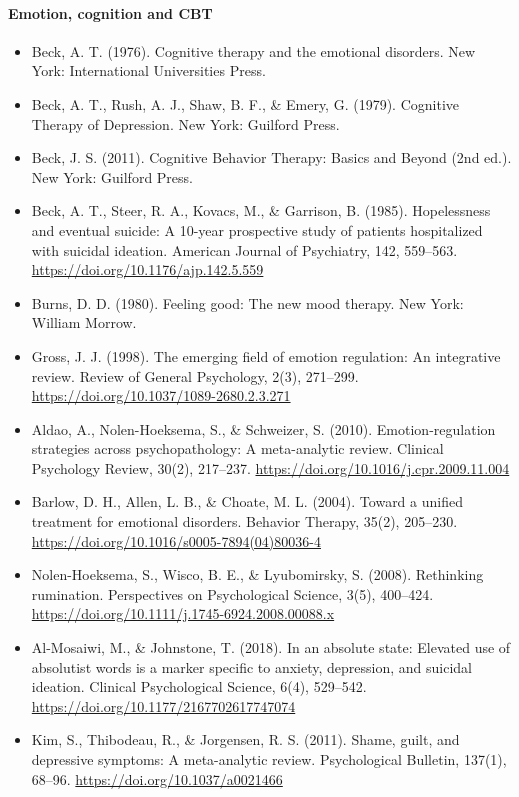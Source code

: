 \documentclass[10pt]{article}
\theoremstyle{remark}
\begin{document}
\paragraph{Emotion, cognition and CBT}
\begin{itemize}[leftmargin=1em,itemsep=0pt,topsep=1pt,parsep=0pt]
\item Beck, A. T. (1976). Cognitive therapy and the emotional disorders. New York: International Universities Press.
\item Beck, A. T., Rush, A. J., Shaw, B. F., \& Emery, G. (1979). Cognitive Therapy of Depression. New York: Guilford Press.
\item Beck, J. S. (2011). Cognitive Behavior Therapy: Basics and Beyond (2nd ed.). New York: Guilford Press.
\item Beck, A. T., Steer, R. A., Kovacs, M., \& Garrison, B. (1985). Hopelessness and eventual suicide: A 10-year prospective study of patients hospitalized with suicidal ideation. American Journal of Psychiatry, 142, 559--563. \url{https://doi.org/10.1176/ajp.142.5.559}
\item Burns, D. D. (1980). Feeling good: The new mood therapy. New York: William Morrow.
\item Gross, J. J. (1998). The emerging field of emotion regulation: An integrative review. Review of General Psychology, 2(3), 271--299. \url{https://doi.org/10.1037/1089-2680.2.3.271}
\item Aldao, A., Nolen-Hoeksema, S., \& Schweizer, S. (2010). Emotion-regulation strategies across psychopathology: A meta-analytic review. Clinical Psychology Review, 30(2), 217--237. \url{https://doi.org/10.1016/j.cpr.2009.11.004}
\item Barlow, D. H., Allen, L. B., \& Choate, M. L. (2004). Toward a unified treatment for emotional disorders. Behavior Therapy, 35(2), 205--230. \url{https://doi.org/10.1016/s0005-7894(04)80036-4}
\item Nolen-Hoeksema, S., Wisco, B. E., \& Lyubomirsky, S. (2008). Rethinking rumination. Perspectives on Psychological Science, 3(5), 400--424. \url{https://doi.org/10.1111/j.1745-6924.2008.00088.x}
\item Al-Mosaiwi, M., \& Johnstone, T. (2018). In an absolute state: Elevated use of absolutist words is a marker specific to anxiety, depression, and suicidal ideation. Clinical Psychological Science, 6(4), 529--542. \url{https://doi.org/10.1177/2167702617747074}
\item Kim, S., Thibodeau, R., \& Jorgensen, R. S. (2011). Shame, guilt, and depressive symptoms: A meta-analytic review. Psychological Bulletin, 137(1), 68--96. \url{https://doi.org/10.1037/a0021466}

\end{itemize}
\end{document}
